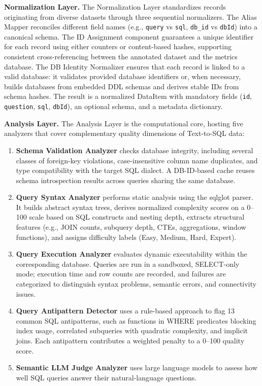 \documentclass[]{einformatica}
\begin{document}
\textbf{Normalization Layer.} The Normalization Layer standardizes records originating from diverse datasets through three sequential normalizers. The Alias Mapper reconciles different field names (e.g., \texttt{query} vs \texttt{sql}, \texttt{db\_id} vs \texttt{dbId}) into a canonical schema. The ID Assignment component guarantees a unique identifier for each record using either counters or content-based hashes, supporting consistent cross-referencing between the annotated dataset and the metrics database. The DB Identity Normalizer ensures that each record is linked to a valid database: it validates provided database identifiers or, when necessary, builds databases from embedded DDL schemas and derives stable IDs from schema hashes. The result is a normalized DataItem with mandatory fields (\texttt{id}, \texttt{question}, \texttt{sql}, \texttt{dbId}), an optional schema, and a metadata dictionary.

\textbf{Analysis Layer.} The Analysis Layer is the computational core, hosting five analyzers that cover complementary quality dimensions of Text-to-SQL data:

\begin{enumerate}
\item \textbf{Schema Validation Analyzer} checks database integrity, including several classes of foreign-key violations, case-insensitive column name duplicates, and type compatibility with the target SQL dialect. A DB-ID-based cache reuses schema introspection results across queries sharing the same database.

\item \textbf{Query Syntax Analyzer} performs static analysis using the sqlglot parser. It builds abstract syntax trees, derives normalized complexity scores on a 0--100 scale based on SQL constructs and nesting depth, extracts structural features (e.g., JOIN counts, subquery depth, CTEs, aggregations, window functions), and assigns difficulty labels (Easy, Medium, Hard, Expert).

\item \textbf{Query Execution Analyzer} evaluates dynamic executability within the corresponding database. Queries are run in a sandboxed, SELECT-only mode; execution time and row counts are recorded, and failures are categorized to distinguish syntax problems, semantic errors, and connectivity issues.

\item \textbf{Query Antipattern Detector} uses a rule-based approach to flag 13 common SQL antipatterns, such as functions in WHERE predicates blocking index usage, correlated subqueries with quadratic complexity, and implicit joins. Each antipattern contributes a weighted penalty to a 0--100 quality score.

\item \textbf{Semantic LLM Judge Analyzer} uses large language models to assess how well SQL queries answer their natural-language questions. 
\end{enumerate}
\end{document}
